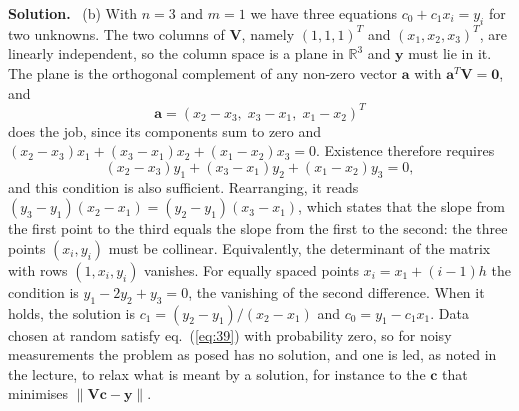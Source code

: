 \documentclass[a4paper,12pt]{paper}
\newenvironment{solution}{\par\noindent\textbf{Solution.}\ }{\par\medskip}
\begin{document}
\begin{solution}
(b) With $n=3$ and $m=1$ we have three equations $c_{0}+c_{1}x_{i}=y_{i}$ for two
unknowns. The two columns of $\mathbf{V}$, namely $(1,1,1)^{T}$ and $(x_{1},x_{2},x_{3})^{T}$,
are linearly independent, so the column space is a plane in $\mathbb{R}^{3}$ and
$\mathbf{y}$ must lie in it. The plane is the orthogonal complement of any non-zero vector
$\mathbf{a}$ with $\mathbf{a}^{T}\mathbf{V}=\mathbf{0}$, and
\begin{equation}
\mathbf{a}=\left(x_{2}-x_{3},\;x_{3}-x_{1},\;x_{1}-x_{2}\right)^{T}
\label{eq:38}
\end{equation}
does the job, since its components sum to zero and
$(x_{2}-x_{3})x_{1}+(x_{3}-x_{1})x_{2}+(x_{1}-x_{2})x_{3}=0$. Existence therefore requires
\begin{equation}
(x_{2}-x_{3})y_{1}+(x_{3}-x_{1})y_{2}+(x_{1}-x_{2})y_{3}=0,
\label{eq:39}
\end{equation}
and this condition is also sufficient. Rearranging, it reads
$(y_{3}-y_{1})(x_{2}-x_{1})=(y_{2}-y_{1})(x_{3}-x_{1})$, which states that the slope from
the first point to the third equals the slope from the first to the second: the three
points $(x_{i},y_{i})$ must be collinear. Equivalently, the determinant of the matrix with
rows $(1,x_{i},y_{i})$ vanishes. For equally spaced points $x_{i}=x_{1}+(i-1)h$ the
condition is $y_{1}-2y_{2}+y_{3}=0$, the vanishing of the second difference. When it holds,
the solution is $c_{1}=(y_{2}-y_{1})/(x_{2}-x_{1})$ and $c_{0}=y_{1}-c_{1}x_{1}$. Data
chosen at random satisfy eq.~(\ref{eq:39}) with probability zero, so for noisy
measurements the problem as posed has no solution, and one is led, as noted in the lecture,
to relax what is meant by a solution, for instance to the $\mathbf{c}$ that minimises
$\|\mathbf{V}\mathbf{c}-\mathbf{y}\|$.


\end{solution}
\end{document}
